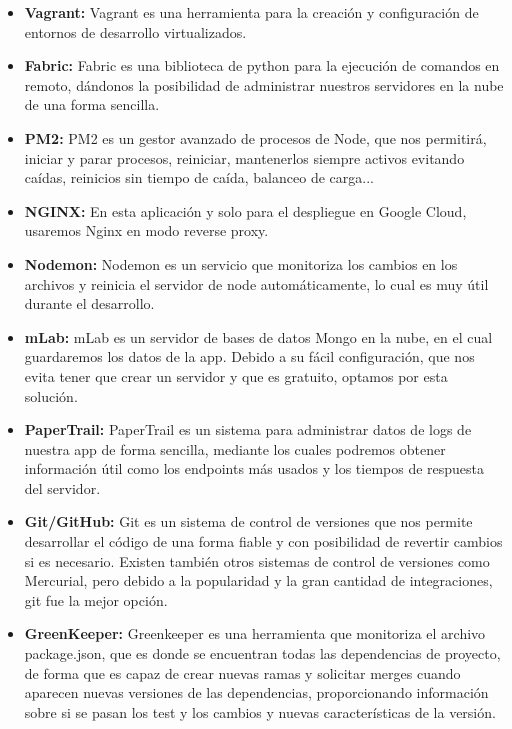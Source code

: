 \begin{itemize}
  \item \textbf{Vagrant:} Vagrant es una herramienta para la creación y configuración de entornos de desarrollo virtualizados.
  
  \item \textbf{Fabric: } Fabric es una biblioteca de python para la ejecución de comandos en remoto, dándonos la posibilidad de administrar nuestros servidores en la nube de una forma sencilla.
  
  \item \textbf{PM2:} PM2 es un gestor avanzado de procesos de Node, que nos permitirá, iniciar y parar procesos, reiniciar, mantenerlos siempre activos evitando caídas, reinicios sin tiempo de caída, balanceo de carga...
  
  \item \textbf{NGINX:} En esta aplicación y solo para el despliegue en Google Cloud, usaremos Nginx en modo reverse proxy.
  
  \item \textbf{Nodemon:} Nodemon es un servicio que monitoriza los cambios en los archivos y reinicia el servidor de node automáticamente, lo cual es muy útil durante el desarrollo.
  
  \item \textbf{mLab:} mLab es un servidor de bases de datos Mongo en la nube, en el cual guardaremos los datos de la app. Debido a su fácil configuración, que nos evita tener que crear un servidor y que es gratuito, optamos por esta solución.
  
  \item \textbf{PaperTrail:} PaperTrail es un sistema para administrar datos de logs de nuestra app de forma sencilla, mediante los cuales podremos obtener información útil como los endpoints más usados y los tiempos de respuesta del servidor.
  
  \item \textbf{Git/GitHub:} Git es un sistema de control de versiones que nos permite desarrollar el código de una forma fiable y con posibilidad de revertir cambios si es necesario. Existen también otros sistemas de control de versiones como Mercurial, pero debido a la popularidad y la gran cantidad de integraciones, git fue la mejor opción.
  
  \item \textbf{GreenKeeper:} Greenkeeper es una herramienta que monitoriza el archivo package.json, que es donde se encuentran todas las dependencias de proyecto, de forma que es capaz de crear nuevas ramas y solicitar merges cuando aparecen nuevas versiones de las dependencias, proporcionando información sobre si se pasan los test y los cambios y nuevas características de la versión.
  

\end{itemize}

